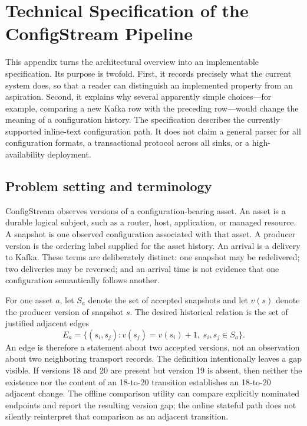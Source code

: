 
\appendix
\section{Technical Specification of the ConfigStream Pipeline}
\label{app:technical-specification}

This appendix turns the architectural overview into an implementable specification. Its purpose is twofold. First, it records precisely what the current system does, so that a reader can distinguish an implemented property from an aspiration. Second, it explains why several apparently simple choices---for example, comparing a new Kafka row with the preceding row---would change the meaning of a configuration history. The specification describes the currently supported inline-text configuration path. It does not claim a general parser for all configuration formats, a transactional protocol across all sinks, or a high-availability deployment.

\subsection{Problem setting and terminology}

ConfigStream observes versions of a configuration-bearing asset. An asset is a durable logical subject, such as a router, host, application, or managed resource. A snapshot is one observed configuration associated with that asset. A producer version is the ordering label supplied for the asset history. An arrival is a delivery to Kafka. These terms are deliberately distinct: one snapshot may be redelivered; two deliveries may be reversed; and an arrival time is not evidence that one configuration semantically follows another.

For one asset $a$, let $S_a$ denote the set of accepted snapshots and let $v(s)$ denote the producer version of snapshot $s$. The desired historical relation is the set of justified adjacent edges
\[
E_a = \{(s_i,s_j) : v(s_j)=v(s_i)+1,\; s_i,s_j\in S_a\}.
\]
An edge is therefore a statement about two accepted versions, not an observation about two neighboring transport records. The definition intentionally leaves a gap visible. If versions 18 and 20 are present but version 19 is absent, then neither the existence nor the content of an 18-to-20 transition establishes an 18-to-20 adjacent change. The offline comparison utility can compare explicitly nominated endpoints and report the resulting version gap; the online stateful path does not silently reinterpret that comparison as an adjacent transition.

